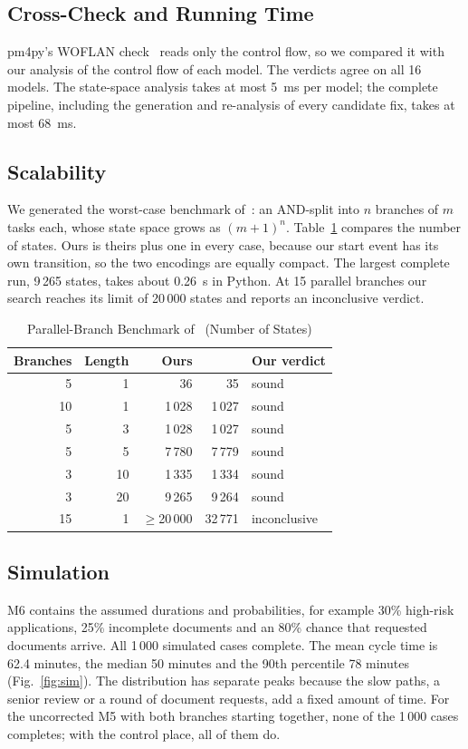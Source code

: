\documentclass[conference]{IEEEtran}
\begin{document}
\subsection{Cross-Check and Running Time}
pm4py's WOFLAN check~\cite{pm4py} reads only the control flow, so we compared it with our analysis of the control
flow of each model. The verdicts agree on all 16 models. The state-space analysis takes at most 5~ms per model;
the complete pipeline, including the generation and re-analysis of every candidate fix, takes at most 68~ms.

\subsection{Scalability}
We generated the worst-case benchmark of~\cite{kraeuter}: an AND-split into $n$ branches of $m$ tasks each, whose
state space grows as $(m+1)^n$. Table~\ref{tab:bench} compares the number of states. Ours is theirs plus one in
every case, because our start event has its own transition, so the two encodings are equally compact. The
largest complete run, 9\,265 states, takes about 0.26~s in Python. At 15 parallel branches our search reaches its
limit of 20\,000 states and reports an inconclusive verdict.

\begin{table}[htbp]
\caption{Parallel-Branch Benchmark of~\cite{kraeuter} (Number of States)}
\begin{center}
\begin{tabular}{|r|r|r|r|l|}
\hline
\textbf{Branches} & \textbf{Length} & \textbf{Ours} & \textbf{\cite{kraeuter}} & \textbf{Our verdict} \\
\hline
5 & 1 & 36 & 35 & sound \\
10 & 1 & 1\,028 & 1\,027 & sound \\
5 & 3 & 1\,028 & 1\,027 & sound \\
5 & 5 & 7\,780 & 7\,779 & sound \\
3 & 10 & 1\,335 & 1\,334 & sound \\
3 & 20 & 9\,265 & 9\,264 & sound \\
15 & 1 & $\ge$20\,000 & 32\,771 & inconclusive \\
\hline
\end{tabular}
\label{tab:bench}
\end{center}
\end{table}

\subsection{Simulation}
M6 contains the assumed durations and probabilities, for example 30\% high-risk applications,
25\% incomplete documents and an 80\% chance that requested documents arrive. All 1\,000 simulated cases
complete. The mean cycle time is 62.4 minutes, the median 50 minutes and the 90th percentile 78 minutes
(Fig.~\ref{fig:sim}). The distribution has separate peaks because the slow paths, a senior review or a round of
document requests, add a fixed amount of time. For the uncorrected M5 with both branches starting together, none
of the 1\,000 cases completes; with the control place, all of them do.
\end{document}
